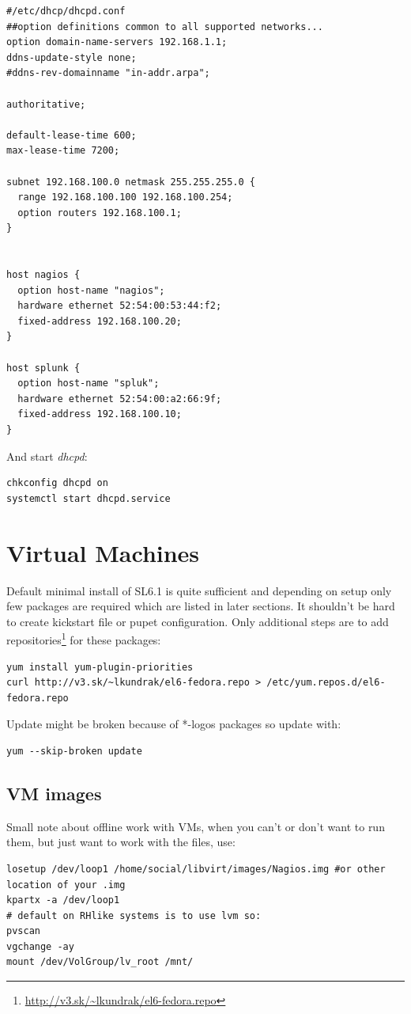 \documentclass[10pt,a4paper,final]{report}
\begin{document}
\begin{lstlisting}
#/etc/dhcp/dhcpd.conf
##option definitions common to all supported networks...
option domain-name-servers 192.168.1.1;
ddns-update-style none;
#ddns-rev-domainname "in-addr.arpa";

authoritative;

default-lease-time 600;
max-lease-time 7200;

subnet 192.168.100.0 netmask 255.255.255.0 {
  range 192.168.100.100 192.168.100.254;
  option routers 192.168.100.1;
}


host nagios {
  option host-name "nagios";
  hardware ethernet 52:54:00:53:44:f2;
  fixed-address 192.168.100.20;
}

host splunk {
  option host-name "spluk";
  hardware ethernet 52:54:00:a2:66:9f;
  fixed-address 192.168.100.10;
}
\end{lstlisting}
And start \emph{dhcpd}:
\begin{lstlisting}
chkconfig dhcpd on
systemctl start dhcpd.service
\end{lstlisting}

\section{Virtual Machines}
Default minimal install of SL6.1 is quite sufficient and depending on setup only few packages are required which are listed in later sections. It shouldn't be hard to create kickstart file or pupet configuration. Only additional steps are to add repositories\footnote{\url{http://v3.sk/~lkundrak/el6-fedora.repo}} for these packages:
\begin{lstlisting}
yum install yum-plugin-priorities
curl http://v3.sk/~lkundrak/el6-fedora.repo > /etc/yum.repos.d/el6-fedora.repo
\end{lstlisting}
Update might be broken because of *-logos packages so update with:
\begin{lstlisting}
yum --skip-broken update
\end{lstlisting}
\subsection{VM images}
Small note about offline work with VMs, when you can't or don't want to run them, but just want to work with the files, use:
\begin{lstlisting}
losetup /dev/loop1 /home/social/libvirt/images/Nagios.img #or other location of your .img
kpartx -a /dev/loop1
# default on RHlike systems is to use lvm so:
pvscan
vgchange -ay
mount /dev/VolGroup/lv_root /mnt/
\end{lstlisting}
\end{document}
